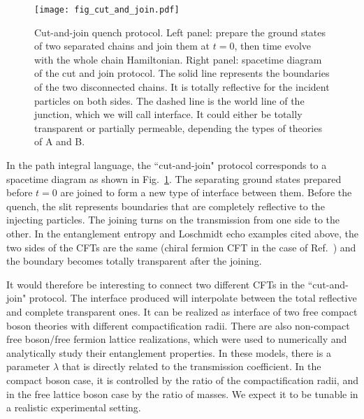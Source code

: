 \begin{figure}[h]
\texttt{[image: fig\_cut\_and\_join.pdf]}
\caption{Cut-and-join quench protocol. Left panel: prepare the ground states of two separated chains and join them at $t = 0$, then time evolve with the whole chain Hamiltonian. Right panel: spacetime diagram of the cut and join protocol. The solid line represents the boundaries of the two disconnected chains. It is totally reflective for the incident particles on both sides. The dashed line is the world line of the junction, which we will call interface. It could either be totally transparent or partially permeable, depending the types of theories of A and B.}
\label{fig:cut-and-join}
\end{figure}

In the path integral language, the ``cut-and-join" protocol corresponds to a spacetime diagram as shown in Fig.~\ref{fig:cut-and-join}. The separating ground states prepared before $t = 0$ are joined to form a new type of interface between them. Before the quench, the slit represents boundaries that are completely reflective to the injecting particles. The joining turns on the transmission from one side to the other. In the entanglement entropy and Loschmidt echo examples cited above\cite{calabrese_entanglement_2007, calabrese_quantum_2016, vasseur_universal_2014}, the two sides of the CFTs are the same (chiral fermion CFT in the case of Ref.~) and the boundary becomes totally transparent after the joining. 

It would therefore be interesting to connect two different CFTs in the ``cut-and-join" protocol. The interface produced will interpolate between the total reflective and complete transparent ones. It can be realized as interface of two free compact boson theories with different compactification radii\cite{bachas_permeable_2002}. There are also non-compact free boson/free fermion lattice realizations, which were used to numerically and analytically\cite{peschel_exact_2012,sakai_entanglement_2008} study their entanglement properties. In these models, there is a parameter $\lambda$ that is directly related to the transmission coefficient. In the compact boson case, it is controlled by the ratio of the compactification radii, and in the free lattice boson case by the ratio of masses. We expect it to be tunable in a realistic experimental setting.

